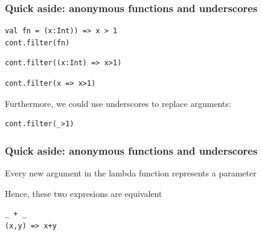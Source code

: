 \documentclass{beamer}
\begin{document}
\begin{frame}[fragile]
  \frametitle{Quick aside: anonymous functions and underscores}



\pause

\vspace{-2em} %
\begin{lstlisting}[basicstyle=\ttfamily\Large]
val fn = (x:Int)) => x > 1
cont.filter(fn)
\end{lstlisting}


\begin{lstlisting}[basicstyle=\ttfamily\Large]
cont.filter((x:Int) => x>1)
\end{lstlisting}

\pause


\begin{lstlisting}[basicstyle=\ttfamily\Large]
cont.filter(x => x>1)
\end{lstlisting}

\pause

{\Large Furthermore, we could use underscores to replace arguments:}

\vspace{-2em}

\begin{lstlisting}[basicstyle=\ttfamily\huge]
cont.filter(_>1)
\end{lstlisting}

\end{frame}

\begin{frame}[fragile]
  \frametitle{Quick aside: anonymous functions and underscores}
  
{\large Every new argument in the lambda function represents a parameter
  
Hence, these two expresions are equivalent
}
  
\begin{lstlisting}[basicstyle=\ttfamily\huge]
_ + _
(x,y) => x+y
\end{lstlisting}


\end{frame}
\end{document}
